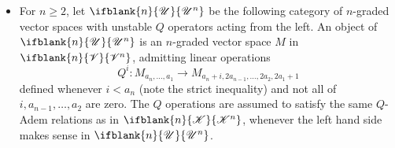 \documentclass[10pt]{article}
\newcommand{\LL}[1]{\ifblank{#1}{\scrK}{\scrK^{#1}}}
\newcommand{\GR}[1]{\ifblank{#1}{\scrV}{\scrV^{#1}}}
\newcommand{\nontop}[1]{\ifblank{#1}{\scrU}{\scrU^{#1}}}
\renewcommand{\Q}{Q}
\begin{document}
\begin{CategoriesOfInterest}
\begin{itemize}

\item For $n\geq2$, let $\nontop{n}$ be the following category of $n$-graded vector spaces with unstable $\Q$ operators acting from the left. An object of $\nontop{n}$ is an $n$-graded vector space $M$ in $\GR{n}$,
admitting linear operations
\[\Q^i:M_{a_n,\ldots,a_1}\to M_{a_n+i,2a_{n-1},\ldots,2a_2,2a_1+1}\]
defined whenever $i< a_n$ (note the strict inequality) and not all of $i,a_{n-1},\ldots,a_{2}$ are zero.
The $\Q$ operations are assumed to satisfy the same $\Q$-Adem relations as in $\LL{n}$, whenever the left hand side makes sense in $\nontop{n}$. %
\end{itemize}


\end{CategoriesOfInterest}
\end{document}
